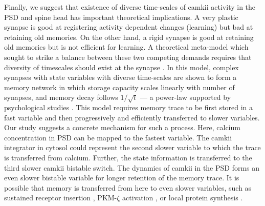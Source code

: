 \documentclass[9pt,lineno,doublespacing]{elife}
\begin{document}
Finally, we suggest that existence of diverse time-scales of \gls{camkii}
activity in the PSD and spine head has important theoretical implications. A
very plastic synapse is good at registering activity dependent changes
(learning) but bad at retaining old memories. On the other hand, a rigid synapse
is good at retaining old memories but is not efficient for learning. A
theoretical meta-model which sought to strike a balance between these two
competing demands requires that diversity of timescales should exist at the
synapse \citep{benna_computational_2016}. In this model, complex synapses with
state variables with diverse time-scales are shown to form a memory network in
which storage capacity scales linearly with number of synapses, and memory decay
follows \(1/\sqrt{t}\) --- a power-law supported by psychological studies
\citep{wixted_form_1991}. This model requires memory trace to be first stored in
a fast variable and then progressively and efficiently transferred to slower
variables.  Our study suggests a concrete mechanism for such a process. Here,
calcium concentration in PSD can be mapped to the fastest variable.  The
\gls{camkii} integrator in cytosol could represent the second slower variable to
which the trace is transferred from calcium. Further, the state information is
transferred to the third slower \gls{camkii} bistable switch. The dynamics of
\gls{camkii} in the PSD forms an even slower bistable variable for longer
retention of the memory trace. It is possible that memory is transferred from
here to even slower variables, such as sustained receptor insertion
\citep{hayer_molecular_2005}, PKM-$\zeta$ activation \citep{sacktor_memory_2012},
or local protein synthesis \citep{aslam_translational_2009}.

\end{document}
